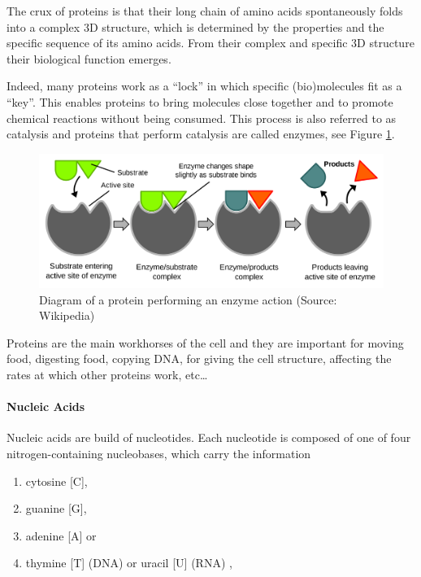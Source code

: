 \documentclass[
  11pt,
]{book}
\providecommand{\tightlist}{%
  \setlength{\itemsep}{0pt}\setlength{\parskip}{0pt}}
\begin{document}
The crux of proteins is that their long chain of amino acids spontaneously folds into a complex 3D structure, which is determined by the properties and the specific sequence of its amino acids. From their complex and specific 3D structure their biological function emerges.

Indeed, many proteins work as a ``lock'' in which specific (bio)molecules fit as a ``key''. This enables proteins to bring molecules close together and to promote chemical reactions without being consumed. This process is also referred to as catalysis and proteins that perform catalysis are called enzymes, see Figure \ref{fig:enzyme}.

\begin{figure}

{\centering \includegraphics[width=0.5\linewidth]{./figs/EnzymePadlockKey} 

}

\caption{Diagram of a protein performing an enzyme action (Source: Wikipedia)}\label{fig:enzyme}
\end{figure}

Proteins are the main workhorses of the cell and they are important for moving food, digesting food, copying DNA, for giving the cell structure, affecting the rates at which other proteins work, etc\ldots{}

\hypertarget{sectionNucleicAcids}{%
\paragraph{Nucleic Acids}\label{sectionNucleicAcids}}

Nucleic acids are build of nucleotides.
Each nucleotide is composed of one of four nitrogen-containing nucleobases, which carry the information

\begin{enumerate}
\def\labelenumi{\arabic{enumi}.}
\tightlist
\item
  cytosine {[}C{]},
\item
  guanine {[}G{]},
\item
  adenine {[}A{]} or
\item
  thymine {[}T{]} (DNA) or uracil {[}U{]} (RNA) ,
\end{enumerate}
\end{document}
